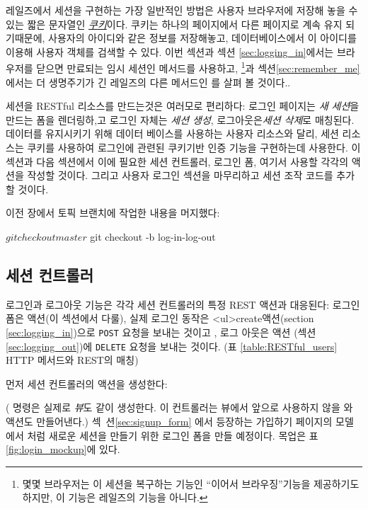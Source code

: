 레일즈에서 세션을 구현하는 가장 일반적인 방법은 사용자 브라우저에 저장해 놓을 수 있는 짧은 문자열인 \href{http://en.wikipedia.org/wiki/HTTP_cookie}{\emph{쿠키}}이다. 쿠키는 하나의 페이지에서 다른 페이지로 계속 유지 되기때문에, 사용자의 아이디와 같은 정보를 저장해놓고, 데이터베이스에서 이 아이디를 이용해 사용자 객체를 검색할 수 있다. 이번 섹션과 섹션 \ref{sec:logging_in}에서는 브라우저를 닫으면 만료되는 임시 세션인  메서드를 사용하고, \footnote{몇몇 브라우저는 이 세션을 복구하는 기능인 ``이어서 브라우징''기능을 제공하기도 하지만, 이 기능은 레일즈의 기능을 아니다.}과  섹션\ref{sec:remember_me}에서는 더 생명주기가 긴 레일즈의 다른 메서드인 를 살펴 볼 것이다.. 

세션을 RESTful 리소스를 만드는것은 여러모로 편리하다: 로그인 페이지는 \emph{새 세션}을 만드는 폼을 렌더링하,고 로그인 자체는 \emph{세션 생성}, 로그아웃은\emph{세션 삭제}로 매칭된다. 데이터를 유지시키기 위해 데이터 베이스를 사용하는 사용자 리소스와 달리, 세션 리소스는 쿠키를 사용하여 로그인에 관련된 쿠키기반 인증 기능을 구현하는데 사용한다. 이 섹션과 다음 섹션에서 이에 필요한 세션 컨트롤러, 로그인 폼, 여기서 사용할 각각의 액션을 작성할 것이다. 그리고 사용자 로그인 섹션을 마무리하고 세션 조작 코드를 추가할 것이다. 

이전 장에서 토픽 브랜치에 작업한 내용을 머지했다: 

\begin{code} $ git checkout master $ git checkout -b log-in-log-out \end{code} 

\subsection{세션 컨트롤러} \label{sec:sessions_controller} 

로그인과 로그아웃 기능은 각각 세션 컨트롤러의 특정 REST 액션과 대응된다: 로그인 폼은  액션(이 섹션에서 다룰), 실제 로그인 동작은 <ul>{create}액션(section \ref{sec:logging_in})으로 \texttt{POST} 요청을 보내는 것이고 , 로그 아웃은  액션 (섹션 \ref{sec:logging_out})에 \texttt{DELETE} 요청을 보내는 것이다. (표 \ref{table:RESTful_users} HTTP 메서드와 REST의 매칭) 

먼저 세션 컨트롤러의  액션을 생성한다: 


\noindent ( 명령은 실제로 \emph{뷰}도 같이 생성한다. 이 컨트롤러는 뷰에서 앞으로 사용하지 않을  와  액션도 만들어낸다.) 섹~션\ref{sec:signup_form} 에서 등장하는 가입하기 페이지의 모델에서 처럼 새로운 세션을 만들기 위한 로그인 폼을 만들 예정이다. 목업은 표 \ref{fig:login_mockup}에 있다. 


